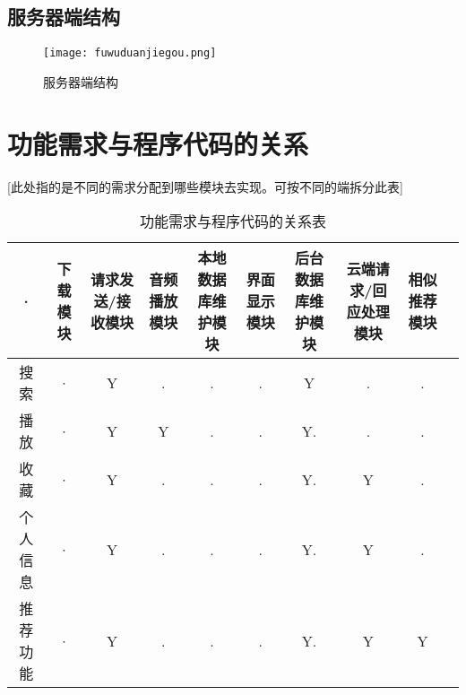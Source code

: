 \subsection{服务器端结构}

\begin{figure}[H]
	\centering
	\texttt{[image: fuwuduanjiegou.png]}
	\caption{服务器端结构} 
	\label{fig:figure8ass}
\end{figure}




\section{功能需求与程序代码的关系}
[此处指的是不同的需求分配到哪些模块去实现。可按不同的端拆分此表]
\begin{table}[htbp]
\centering
\caption{功能需求与程序代码的关系表} \label{tab:requirement-module}
\begin{tabular}{|c|c|c|c|c|c|c|c|c|c|}
    \hline
    · & 下载模块 & 请求发送/接收模块 & 音频播放模块 & 本地数据库维护模块 & 界面显示模块 & 后台数据库维护模块
     & 云端请求/回应处理模块 & 相似推荐模块 \\
    \hline
    搜索 & · & Y & . & . & .& Y& .& . \\
    \hline
    播放 & · & Y & Y & . & .& Y.& .& . \\
    \hline
    收藏 & · & Y & . & . & .& Y.& Y& . \\
    \hline
    个人信息 & · & Y & . & . & .& Y.& Y& . \\
    \hline
    推荐功能 & · & Y & . & . & .& Y.& Y& Y \\
    \hline
\end{tabular}
\end{table}